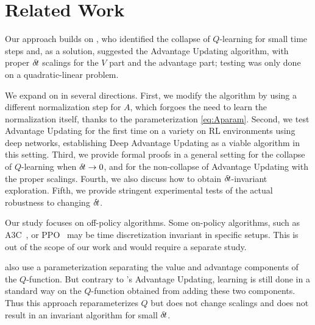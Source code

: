 \section{Related Work}
\label{sec:related}

Our approach builds on \cite{adv_upd},  who identified the collapse of
$Q$-learning for small time steps and, as a solution, suggested the Advantage
Updating algorithm, with proper ${\delta\hspace{-.1em}t}$ scalings for the $V$ part and
the advantage part; testing was only done on a quadratic-linear problem.

We expand on \cite{adv_upd} in several directions. First, we modify the
algorithm by
using a different normalization step for $A$, which forgoes the need to
learn the normalization itself, thanks to the parameterization
\eqref{eq:Aparam}. Second, we test Advantage Updating for the first time on a
variety on RL environments using deep networks, establishing Deep
Advantage Updating as a viable algorithm in this setting.  Third,
we provide formal proofs in a general setting for the collapse of $Q$-learning when ${\delta\hspace{-.1em}t}\to
0$, and for the non-collapse of Advantage Updating with the proper scalings.
Fourth, we also discuss how to obtain ${\delta\hspace{-.1em}t}$-invariant exploration. Fifth, we
provide stringent experimental tests of the actual robustness to changing
${\delta\hspace{-.1em}t}$.

Our study focuses on off-policy algorithms. Some on-policy algorithms, such as
A3C~\cite{a3c}, or PPO~\cite{ppo} may be time discretization invariant in
specific setups. This is out of the scope of our work and would require a
separate study.

\cite{dueling_nets} also use a parameterization separating
the value and advantage components of the $Q$-function. But contrary to
\cite{adv_upd}'s Advantage Updating, learning is still done in a standard
way on the $Q$-function obtained from adding these two components. Thus this
approach reparameterizes $Q$ but does not change scalings
and does not result in an invariant algorithm for small ${\delta\hspace{-.1em}t}$.%

